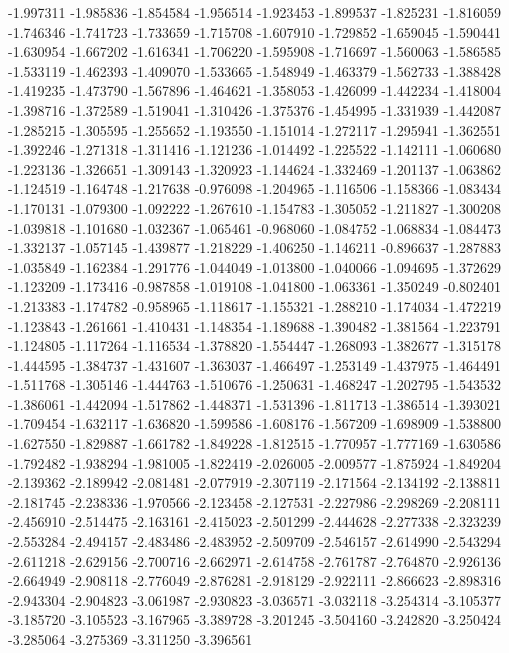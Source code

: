 -1.997311
-1.985836
-1.854584
-1.956514
-1.923453
-1.899537
-1.825231
-1.816059
-1.746346
-1.741723
-1.733659
-1.715708
-1.607910
-1.729852
-1.659045
-1.590441
-1.630954
-1.667202
-1.616341
-1.706220
-1.595908
-1.716697
-1.560063
-1.586585
-1.533119
-1.462393
-1.409070
-1.533665
-1.548949
-1.463379
-1.562733
-1.388428
-1.419235
-1.473790
-1.567896
-1.464621
-1.358053
-1.426099
-1.442234
-1.418004
-1.398716
-1.372589
-1.519041
-1.310426
-1.375376
-1.454995
-1.331939
-1.442087
-1.285215
-1.305595
-1.255652
-1.193550
-1.151014
-1.272117
-1.295941
-1.362551
-1.392246
-1.271318
-1.311416
-1.121236
-1.014492
-1.225522
-1.142111
-1.060680
-1.223136
-1.326651
-1.309143
-1.320923
-1.144624
-1.332469
-1.201137
-1.063862
-1.124519
-1.164748
-1.217638
-0.976098
-1.204965
-1.116506
-1.158366
-1.083434
-1.170131
-1.079300
-1.092222
-1.267610
-1.154783
-1.305052
-1.211827
-1.300208
-1.039818
-1.101680
-1.032367
-1.065461
-0.968060
-1.084752
-1.068834
-1.084473
-1.332137
-1.057145
-1.439877
-1.218229
-1.406250
-1.146211
-0.896637
-1.287883
-1.035849
-1.162384
-1.291776
-1.044049
-1.013800
-1.040066
-1.094695
-1.372629
-1.123209
-1.173416
-0.987858
-1.019108
-1.041800
-1.063361
-1.350249
-0.802401
-1.213383
-1.174782
-0.958965
-1.118617
-1.155321
-1.288210
-1.174034
-1.472219
-1.123843
-1.261661
-1.410431
-1.148354
-1.189688
-1.390482
-1.381564
-1.223791
-1.124805
-1.117264
-1.116534
-1.378820
-1.554447
-1.268093
-1.382677
-1.315178
-1.444595
-1.384737
-1.431607
-1.363037
-1.466497
-1.253149
-1.437975
-1.464491
-1.511768
-1.305146
-1.444763
-1.510676
-1.250631
-1.468247
-1.202795
-1.543532
-1.386061
-1.442094
-1.517862
-1.448371
-1.531396
-1.811713
-1.386514
-1.393021
-1.709454
-1.632117
-1.636820
-1.599586
-1.608176
-1.567209
-1.698909
-1.538800
-1.627550
-1.829887
-1.661782
-1.849228
-1.812515
-1.770957
-1.777169
-1.630586
-1.792482
-1.938294
-1.981005
-1.822419
-2.026005
-2.009577
-1.875924
-1.849204
-2.139362
-2.189942
-2.081481
-2.077919
-2.307119
-2.171564
-2.134192
-2.138811
-2.181745
-2.238336
-1.970566
-2.123458
-2.127531
-2.227986
-2.298269
-2.208111
-2.456910
-2.514475
-2.163161
-2.415023
-2.501299
-2.444628
-2.277338
-2.323239
-2.553284
-2.494157
-2.483486
-2.483952
-2.509709
-2.546157
-2.614990
-2.543294
-2.611218
-2.629156
-2.700716
-2.662971
-2.614758
-2.761787
-2.764870
-2.926136
-2.664949
-2.908118
-2.776049
-2.876281
-2.918129
-2.922111
-2.866623
-2.898316
-2.943304
-2.904823
-3.061987
-2.930823
-3.036571
-3.032118
-3.254314
-3.105377
-3.185720
-3.105523
-3.167965
-3.389728
-3.201245
-3.504160
-3.242820
-3.250424
-3.285064
-3.275369
-3.311250
-3.396561
